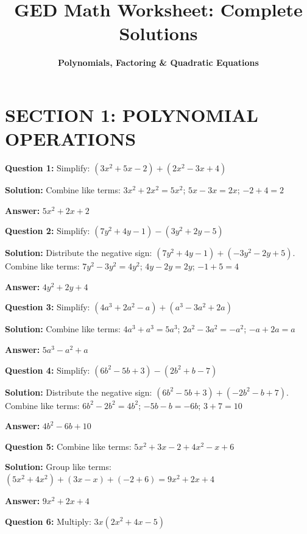 \documentclass[12pt]{article}
\title{\textbf{GED Math Worksheet: Complete Solutions}}
\author{\textbf{Polynomials, Factoring \& Quadratic Equations}}
\date{}
\begin{document}
\maketitle

\hrulefill

\section*{SECTION 1: POLYNOMIAL OPERATIONS}

\noindent
\textbf{Question 1:} Simplify: $(3x^2 + 5x - 2) + (2x^2 - 3x + 4)$

\textbf{Solution:} Combine like terms: $3x^2 + 2x^2 = 5x^2$; $5x - 3x = 2x$; $-2 + 4 = 2$

\textbf{Answer:} $\boxed{5x^2 + 2x + 2}$

\vspace{0.3cm}
\noindent
\textbf{Question 2:} Simplify: $(7y^2 + 4y - 1) - (3y^2 + 2y - 5)$

\textbf{Solution:} Distribute the negative sign: $(7y^2 + 4y - 1) + (-3y^2 - 2y + 5)$. Combine like terms: $7y^2 - 3y^2 = 4y^2$; $4y - 2y = 2y$; $-1 + 5 = 4$

\textbf{Answer:} $\boxed{4y^2 + 2y + 4}$

\vspace{0.3cm}
\noindent
\textbf{Question 3:} Simplify: $(4a^3 + 2a^2 - a) + (a^3 - 3a^2 + 2a)$

\textbf{Solution:} Combine like terms: $4a^3 + a^3 = 5a^3$; $2a^2 - 3a^2 = -a^2$; $-a + 2a = a$

\textbf{Answer:} $\boxed{5a^3 - a^2 + a}$

\vspace{0.3cm}
\noindent
\textbf{Question 4:} Simplify: $(6b^2 - 5b + 3) - (2b^2 + b - 7)$

\textbf{Solution:} Distribute the negative sign: $(6b^2 - 5b + 3) + (-2b^2 - b + 7)$. Combine like terms: $6b^2 - 2b^2 = 4b^2$; $-5b - b = -6b$; $3 + 7 = 10$

\textbf{Answer:} $\boxed{4b^2 - 6b + 10}$

\vspace{0.3cm}
\noindent
\textbf{Question 5:} Combine like terms: $5x^2 + 3x - 2 + 4x^2 - x + 6$

\textbf{Solution:} Group like terms: $(5x^2 + 4x^2) + (3x - x) + (-2 + 6) = 9x^2 + 2x + 4$

\textbf{Answer:} $\boxed{9x^2 + 2x + 4}$

\vspace{0.3cm}
\noindent
\textbf{Question 6:} Multiply: $3x(2x^2 + 4x - 5)$
\end{document}
